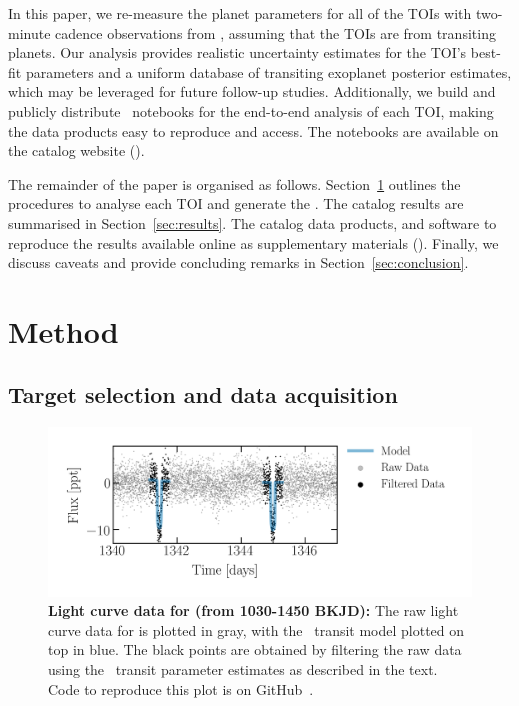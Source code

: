 \documentclass[floatfix,ApJL,twocolumn]{aastex631}
\begin{document}
In this paper, we re-measure the planet parameters for all \red{\numAnalysed} of the TOIs with two-minute cadence observations from , assuming that the TOIs are from transiting planets.
Our analysis provides realistic uncertainty estimates for the TOI's best-fit parameters and a uniform database of transiting exoplanet posterior estimates, which may be leveraged for future follow-up studies.
Additionally, we build and publicly distribute \jupyter\ notebooks for the end-to-end analysis of each TOI, making the data products easy to reproduce and access.
The notebooks are available on the catalog website (\atlasUrl).

The remainder of the paper is organised as follows.
Section~\ref{sec:method} outlines the procedures to analyse each TOI and generate the \tessAtlas.
The catalog results are summarised in Section~\ref{sec:results}.
The catalog data products, and software to reproduce the results available online as supplementary materials (\atlasUrl).
Finally, we discuss caveats and provide concluding remarks in Section~\ref{sec:conclusion}.

\section{Method} \label{sec:method}

\subsection{Target selection and data acquisition}
\begin{figure}
    \includegraphics[width=\linewidth]{figures/raw_data_toi_103.png}
    \caption{\textbf{Light curve data for  (from 1030-1450 BKJD):} The raw light curve data for  is plotted in gray, with the \exofop\ transit model plotted on top in blue. The black points are obtained by filtering the raw data using the \exofop\ transit parameter estimates as described in the text. Code to reproduce this plot is on GitHub~\paperPlotsLink.}
    \label{fig:raw}
\end{figure}
\end{document}
